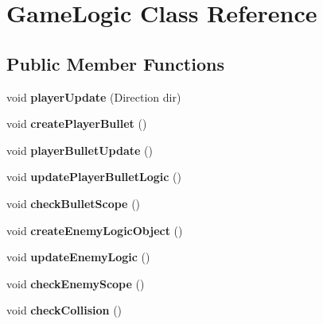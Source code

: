 \hypertarget{class_game_logic}{}\section{Game\+Logic Class Reference}
\label{class_game_logic}
\subsection*{Public Member Functions}
\begin{DoxyCompactItemize}
\item 
\mbox{\label{class_game_logic_a3bb909e55fc7c811aa0e3e6a92b881bb}} 
void {\bfseries player\+Update} (Direction dir)
\item 
\mbox{\label{class_game_logic_a05dec53eb3c36cf1a669c973fa0b16ae}} 
void {\bfseries create\+Player\+Bullet} ()
\item 
\mbox{\label{class_game_logic_a2293e862afa9caa43ac1c21757b9c914}} 
void {\bfseries player\+Bullet\+Update} ()
\item 
\mbox{\label{class_game_logic_abe02a85cda082eea7d0dc758d8fe3082}} 
void {\bfseries update\+Player\+Bullet\+Logic} ()
\item 
\mbox{\label{class_game_logic_aa0800f256ffc094ee5373d372c26c2ea}} 
void {\bfseries check\+Bullet\+Scope} ()
\item 
\mbox{\label{class_game_logic_ad88d3d16d008722d8a85449beb1ed589}} 
void {\bfseries create\+Enemy\+Logic\+Object} ()
\item 
\mbox{\label{class_game_logic_a07cb8f8cb380fa2cd070aa30148a8ffd}} 
void {\bfseries update\+Enemy\+Logic} ()
\item 
\mbox{\label{class_game_logic_a5c0dc59099b2e223c99fc4a4d51627f0}} 
void {\bfseries check\+Enemy\+Scope} ()
\item 
\mbox{\label{class_game_logic_a2ff25304164107a3f4549f108db95a23}} 
void {\bfseries check\+Collision} ()
\item 
\mbox{\label{class_game_logic_ab2b56581a56239bb837e6eeea0a2991d}} 

\end{DoxyCompactItemize}
